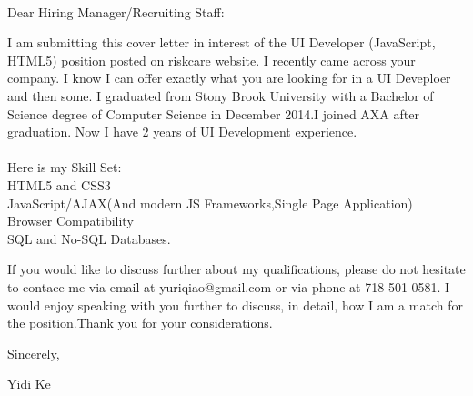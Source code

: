 \documentclass{letter}
\begin{document}
\begin{letter}
{\\
}


\opening{Dear Hiring Manager/Recruiting Staff:}

I am submitting this cover letter in interest of the UI Developer (JavaScript, HTML5) position posted on riskcare website. I recently came across your company. I know I can offer exactly what you are looking for in a UI Deveploer and then some. I graduated from Stony Brook University with a Bachelor of Science degree of Computer Science in December 2014.I joined AXA after graduation. Now I have 2 years of UI Development experience.\\
\\
Here is my Skill Set:\\
HTML5 and CSS3\\ JavaScript/AJAX(And modern JS Frameworks,Single Page Application)\\
 Browser Compatibility\\
%
%
 SQL and No-SQL Databases.



If you would like to discuss further about my qualifications, please do
not hesitate to contace me via email at yuriqiao@gmail.com or via phone at 718-501-0581. I would enjoy speaking with you further to discuss, in detail, how I am a match for the position.Thank you for your considerations.


\closing{Sincerely,
}


Yidi Ke\\

\end{letter}
\end{document}
